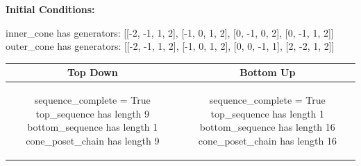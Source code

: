 \documentclass[10pt]{article}
\begin{document}
\textbf{Initial Conditions:}
\begin{SAGE}
inner_cone has generators: 
[[-2, -1, 1, 2], [-1, 0, 1, 2], [0, -1, 0, 2], [0, -1, 1, 2]]
outer_cone has generators: 
[[-2, -1, 1, 2], [-1, 0, 1, 2], [0, 0, -1, 1], [2, -2, 1, 2]]

\end{SAGE}
\begin{tabular}{c|c}
\textbf{Top Down} & \textbf{Bottom Up} \\ \hline  
\begin{SAGE}
sequence_complete = True
top_sequence has length 9
bottom_sequence has length 1
cone_poset_chain has length 9
\end{SAGE} 
&
\begin{SAGE}
sequence_complete = True
top_sequence has length 1
bottom_sequence has length 16
cone_poset_chain has length 16
\end{SAGE} 
\\ \hline


\end{tabular}
\end{document}
